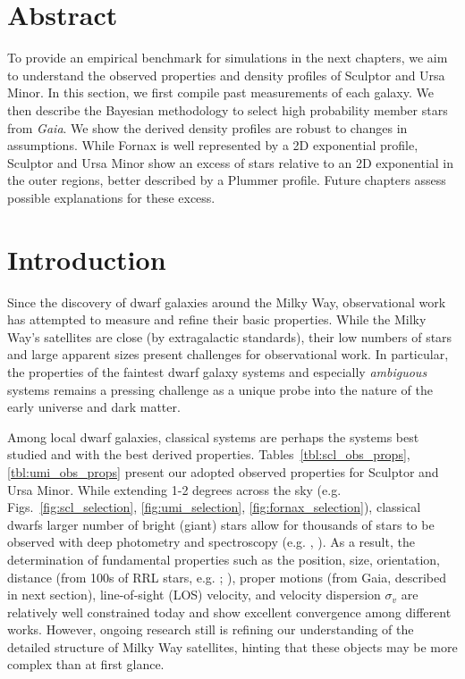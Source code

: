 \section{Abstract}\label{abstract}

To provide an empirical benchmark for simulations in the next chapters,
we aim to understand the observed properties and density profiles of
Sculptor and Ursa Minor. In this section, we first compile past
measurements of each galaxy. We then describe the \citet{jensen+2024}
Bayesian methodology to select high probability member stars from
\emph{Gaia}. We show the derived density profiles are robust to changes
in assumptions. While Fornax is well represented by a 2D exponential
profile, Sculptor and Ursa Minor show an excess of stars relative to an
2D exponential in the outer regions, better described by a Plummer
profile. Future chapters assess possible explanations for these excess.

\section{Introduction}\label{introduction}

Since the discovery of dwarf galaxies around the Milky Way,
observational work has attempted to measure and refine their basic
properties. While the Milky Way's satellites are close (by extragalactic
standards), their low numbers of stars and large apparent sizes present
challenges for observational work. In particular, the properties of the
faintest dwarf galaxy systems and especially \emph{ambiguous} systems
remains a pressing challenge as a unique probe into the nature of the
early universe and dark matter.

Among local dwarf galaxies, classical systems are perhaps the systems
best studied and with the best derived properties.
Tables~\ref{tbl:scl_obs_props}, \ref{tbl:umi_obs_props} present our
adopted observed properties for Sculptor and Ursa Minor. While extending
1-2 degrees across the sky (e.g.
Figs.~\ref{fig:scl_selection}, \ref{fig:umi_selection}, \ref{fig:fornax_selection}),
classical dwarfs larger number of bright (giant) stars allow for
thousands of stars to be observed with deep photometry and spectroscopy
(e.g. \citet{tolstoy+2023}, \citet{pace+2020}). As a result, the
determination of fundamental properties such as the position, size,
orientation, distance (from 100s of RRL stars, e.g. \citet{tran+2022};
\citet{garofalo+2025}), proper motions (from Gaia, described in next
section), line-of-sight (LOS) velocity, and velocity dispersion
\(\sigma_v\) are relatively well constrained today and show excellent
convergence among different works. However, ongoing research still is
refining our understanding of the detailed structure of Milky Way
satellites, hinting that these objects may be more complex than at first
glance.

